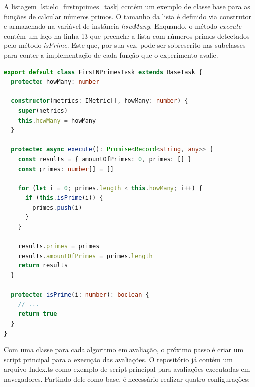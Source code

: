 \documentclass[12pt]{tcc}
\begin{document}
	A listagem \ref{lst:elc_firstnprimes_task} contém um exemplo de classe base para as funções de calcular números primos.
	O tamanho da lista é definido via construtor e armazenado na variável de instância \emph{howMany}.
	Enquando, o método \emph{execute} contém um laço na linha 13 que preenche a lista com números primos detectados pelo método \emph{isPrime}.
	Este que, por sua vez, pode ser sobrescrito nas subclasses para conter a implementação de cada função que o experimento avalie.

\begin{lstlisting}[label={lst:elc_firstnprimes_task}, caption={Exemplo de classe encapulando um algoritmo de cálculo de números primos.}, language=TypeScript, breaklines=true]
export default class FirstNPrimesTask extends BaseTask {
  protected howMany: number

  constructor(metrics: IMetric[], howMany: number) {
    super(metrics)
    this.howMany = howMany
  }

  protected async execute(): Promise<Record<string, any>> {
    const results = { amountOfPrimes: 0, primes: [] }
    const primes: number[] = []

    for (let i = 0; primes.length < this.howMany; i++) {
      if (this.isPrime(i)) {
        primes.push(i)
      }
    }

    results.primes = primes
    results.amountOfPrimes = primes.length
    return results
  }

  protected isPrime(i: number): boolean {
    // ...
    return true
  }
}
\end{lstlisting}

	Com uma classe para cada algoritmo em avaliação, o próximo passo é criar um script principal para a execução das avaliações.
	O repositório já contém um arquivo Index.ts como exemplo de script principal para avaliações executadas em navegadores.
	Partindo dele como base, é necessário realizar quatro configurações:
\end{document}
